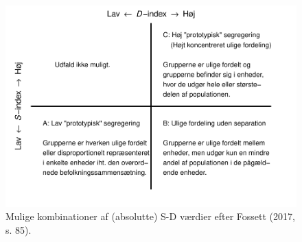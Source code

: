 \documentclass[
]{book}
\begin{document}
\begin{figure}
\includegraphics[width=1\linewidth]{en-befolkning-blander-sig_files/figure-latex/fig-9-4-1} \caption{Mulige kombinationer af (absolutte) S-D værdier efter Fossett (2017, s. 85).}\label{fig:fig-9-4}
\end{figure}
\end{document}

